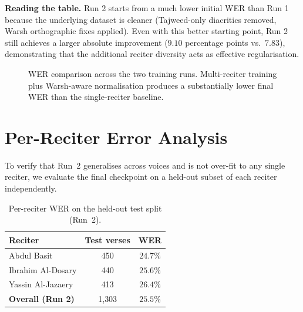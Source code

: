 \documentclass[12pt,a4paper]{report}
\begin{document}
\textbf{Reading the table.} Run 2 starts from a much lower initial WER
than Run 1 because the underlying dataset is cleaner (Tajweed-only
diacritics removed, Warsh orthographic fixes applied). Even with this
better starting point, Run 2 still achieves a larger absolute
improvement ($9.10$ percentage points vs.\ $7.83$), demonstrating that
the additional reciter diversity acts as effective regularisation.

\begin{figure}[H]
  \centering
  \caption{WER comparison across the two training runs. Multi-reciter
  training plus Warsh-aware normalisation produces a substantially lower
  final WER than the single-reciter baseline.}
  \label{fig:mt_wer_compare}
\end{figure}

\section{Per-Reciter Error Analysis}

To verify that Run~2 generalises across voices and is not over-fit to
any single reciter, we evaluate the final checkpoint on a held-out
subset of each reciter independently.

\begin{table}[H]
  \centering
  \caption{Per-reciter WER on the held-out test split (Run~2).}
  \label{tab:mt_per_reciter}
  \renewcommand{\arraystretch}{1.3}
  \begin{tabular}{lcc}
    \toprule
    \textbf{Reciter} & \textbf{Test verses} & \textbf{WER} \\
    \midrule
    Abdul Basit                & 450 & $24.7\%$ \\
    Ibrahim Al-Dosary          & 440 & $25.6\%$ \\
    Yassin Al-Jazaery          & 413 & $26.4\%$ \\
    \midrule
    \textbf{Overall (Run 2)}   & 1{,}303 & $\mathbf{25.5\%}$ \\
    \bottomrule
  \end{tabular}
\end{table}
\end{document}
